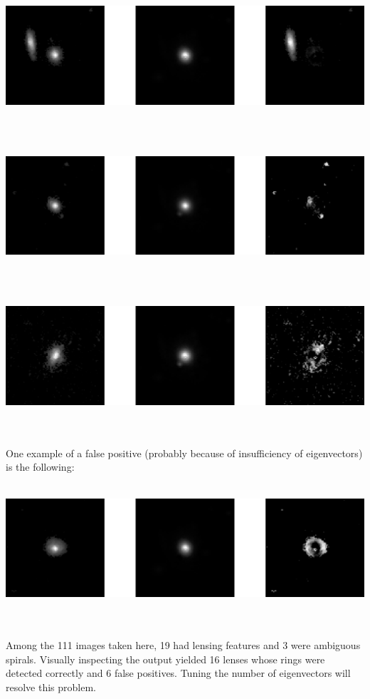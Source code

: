 \documentclass[11pt, a4paper]{article}
\begin{document}
\centerline{\includegraphics[scale=0.5]{1223_Source_Subtraction.png}} \\ \\
\centerline{\includegraphics[scale=0.5]{1948_Source_Subtraction.png}} \\ \\
\centerline{\includegraphics[scale=0.5]{3559_Final_Subtraction.png}} \\ \\
One example of a false positive (probably because of insufficiency of eigenvectors) is the following: \\ \\
\centerline{\includegraphics[scale=0.5]{1589_Failure_Case_False_Positive.png}} \\ \\
Among the 111 images taken here, 19 had lensing features and 3 were ambiguous spirals. Visually inspecting the output yielded 16 lenses whose rings were detected correctly and 6 false positives. Tuning the number of eigenvectors will resolve this problem.
\end{document}

